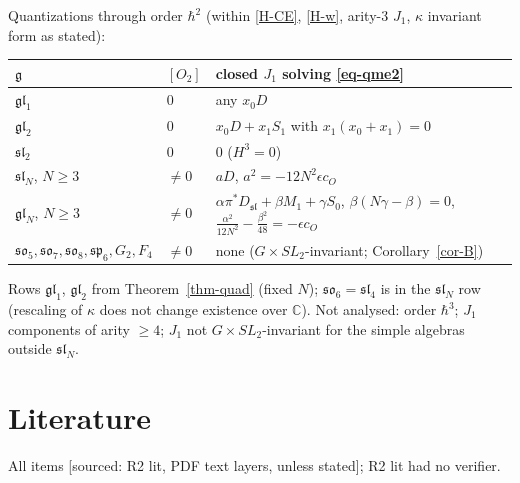 \documentclass[10pt,a4paper]{article}
\numberwithin{equation}{section}
\theoremstyle{definition}
\theoremstyle{remark}
\newcommand{\g}{\mathfrak g}
\newcommand{\fsl}{\mathfrak{sl}}
\newcommand{\fgl}{\mathfrak{gl}}
\newcommand{\fso}{\mathfrak{so}}
\newcommand{\fsp}{\mathfrak{sp}}
\newcommand{\src}[1]{\textup{[sourced: #1]}}
\begin{document}
Quantizations through order $\hbar^2$ (within \ref{H-CE}, \ref{H-w}, arity-3 $J_1$, $\kappa$ invariant form as stated):
\begin{center}
\begin{tabular}{@{}lll@{}}
\toprule
$\g$ & $[O_2]$ & closed $J_1$ solving \eqref{eq-qme2}\\
\midrule
$\fgl_1$ & $0$ & any $x_0D$\\
$\fgl_2$ & $0$ & $x_0D+x_1S_1$ with $x_1(x_0+x_1)=0$\\
$\fsl_2$ & $0$ & $0$ ($H^3=0$)\\
$\fsl_N$, $N\ge3$ & $\ne0$ & $aD$, $a^2=-12N^2\epsilon c_O$\\
$\fgl_N$, $N\ge3$ & $\ne0$ & $\alpha\pi^*D_{\fsl}+\beta M_1+\gamma S_0$, $\beta(N\gamma-\beta)=0$, $\frac{\alpha^2}{12N^2}-\frac{\beta^2}{48}=-\epsilon c_O$\\
$\fso_5,\fso_7,\fso_8,\fsp_6,G_2,F_4$ & $\ne0$ & none ($G\times SL_2$-invariant; Corollary~\ref{cor-B})\\
\bottomrule
\end{tabular}
\end{center}
Rows $\fgl_1$, $\fgl_2$ from Theorem~\ref{thm-quad} (fixed $N$); $\fso_6=\fsl_4$ is in the $\fsl_N$ row (rescaling of $\kappa$ does not change existence over $\mathbb C$). Not analysed: order $\hbar^3$; $J_1$ components of arity $\ge4$; $J_1$ not $G\times SL_2$-invariant for the simple algebras outside $\fsl_N$.

\section{Literature}\label{sec-lit}

All items \src{R2 lit, PDF text layers, unless stated}; R2 lit had no verifier.
\end{document}
